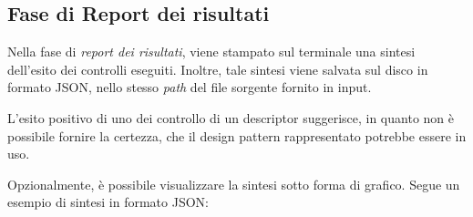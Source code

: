 \subsection{Fase di Report dei risultati}
Nella fase di \textit{report dei risultati}, viene stampato sul terminale una sintesi dell'esito dei controlli eseguiti. Inoltre, tale sintesi viene salvata sul disco in formato JSON, nello stesso \textit{path} del file sorgente fornito in input.\par
L'esito positivo di uno dei controllo di un descriptor suggerisce, in quanto non è possibile fornire la certezza, che il design pattern rappresentato potrebbe essere in uso.\par
Opzionalmente, è possibile visualizzare la sintesi sotto forma di grafico.
\newline
Segue un esempio di sintesi in formato JSON:

